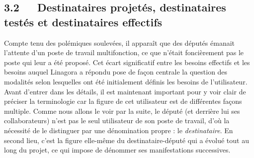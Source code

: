 \documentclass{FramateX}
\begin{document}
\begin{refsection}
\subsection*{3.2~~~Destinataires projetés, destinataires testés et destinataires effectifs}
{}


Compte tenu des polémiques soulevées, il apparaît que des députés
émanait l'attente d'un poste de travail multifonction, ce que n'était
foncièrement pas le poste qui leur a été proposé. Cet écart
significatif entre les besoins effectifs et les besoins auquel Linagora
a répondu pose de façon centrale la question des modalités selon
lesquelles ont été initialement définis les besoins de l'utilisateur.
Avant d'entrer dans les détails, il est maintenant important pour y
voir clair de préciser la terminologie car la figure de cet utilisateur
est de différentes façons multiple. Comme nous allons le voir par la
suite, le député (et derrière lui ses collaborateurs) n'est pas le seul
utilisateur de son poste de travail, d'où la nécessité de le distinguer
par une dénomination propre : le \textit{destinataire}. En second lieu,
c'est la figure elle-même du destinataire-député qui a évolué tout au
long du projet, ce qui impose de dénommer ses manifestations
successives.


\end{refsection}
\end{document}
